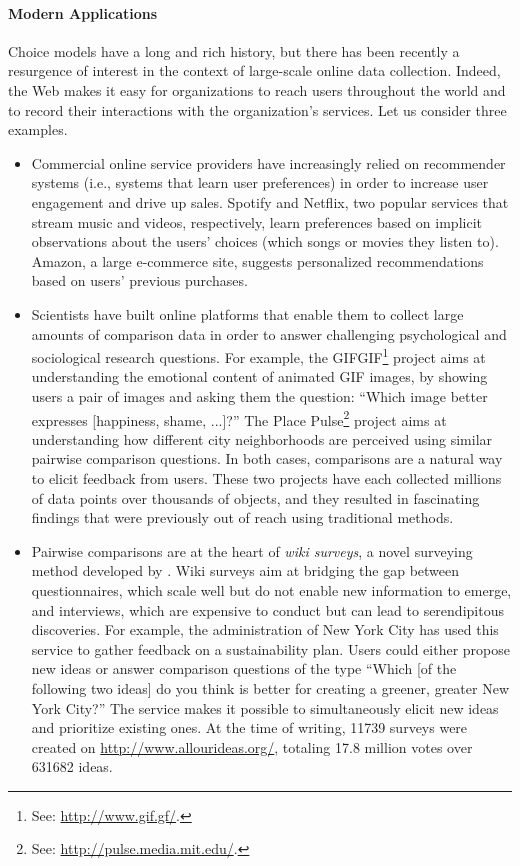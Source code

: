 \paragraph{Modern Applications}
Choice models have a long and rich history, but there has been recently a resurgence of interest in the context of large-scale online data collection.
Indeed, the Web makes it easy for organizations to reach users throughout the world and to record their interactions with the organization's services.
Let us consider three examples.
\begin{itemize}
\item Commercial online service providers have increasingly relied on recommender systems (i.e., systems that learn user preferences) in order to increase user engagement and drive up sales.
Spotify and Netflix, two popular services that stream music and videos, respectively, learn preferences based on implicit observations about the users' choices (which songs or movies they listen to).
Amazon, a large e-commerce site, suggests personalized recommendations based on users' previous purchases.

\item Scientists have built online platforms that enable them to collect large amounts of comparison data in order to answer challenging psychological and sociological research questions.
For example, the GIFGIF\footnote{See: \url{http://www.gif.gf/}.} project aims at understanding the emotional content of animated GIF images, by showing users a pair of images and asking them the question: ``Which image better expresses [happiness, shame, ...]?''
The Place Pulse\footnote{See: \url{http://pulse.media.mit.edu/}.} project aims at understanding how different city neighborhoods are perceived using similar pairwise comparison questions.
In both cases, comparisons are a natural way to elicit feedback from users.
These two projects have each collected millions of data points over thousands of objects, and they resulted in fascinating findings that were previously out of reach using traditional methods. 

\item Pairwise comparisons are at the heart of \emph{wiki surveys}, a novel surveying method developed by \citet{salganik2015wiki}.
Wiki surveys aim at bridging the gap between questionnaires, which scale well but do not enable new information to emerge, and interviews, which are expensive to conduct but can lead to serendipitous discoveries.
For example, the administration of New York City has used this service to gather feedback on a sustainability plan.
Users could either propose new ideas or answer comparison questions of the type ``Which [of the following two ideas] do you think is better for creating a greener, greater New York City?''
The service makes it possible to simultaneously elicit new ideas and prioritize existing ones.
At the time of writing, \num{11739} surveys were created on \url{http://www.allourideas.org/}, totaling \num{17.8} million votes over \num{631682} ideas.
\end{itemize}

